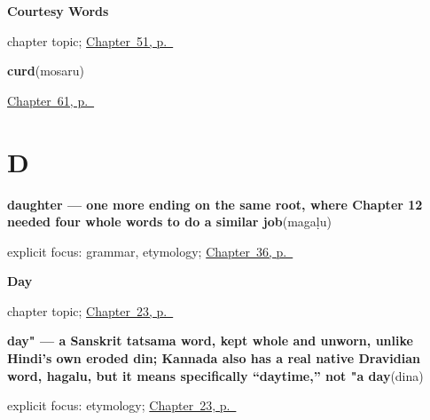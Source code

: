 \noindent\begin{minipage}[t]{\linewidth}
\raggedright
\textbf{Courtesy Words}\par
\footnotesize chapter topic; \hyperref[ch:ka-courtesy]{Chapter~51, p.~\pageref*{ch:ka-courtesy}}
\end{minipage}\par\smallskip

\noindent\begin{minipage}[t]{\linewidth}
\raggedright
\textbf{curd}\enspace\emph{}\enspace(mosaru)\par
\footnotesize \hyperref[ch:ka-kitchen]{Chapter~61, p.~\pageref*{ch:ka-kitchen}}
\end{minipage}\par\smallskip

\section*{D}

\noindent\begin{minipage}[t]{\linewidth}
\raggedright
\textbf{daughter — one more ending on the same root, where Chapter 12 needed four whole words to do a similar job}\enspace\emph{}\enspace(magaḷu)\par
\footnotesize explicit focus: grammar, etymology; \hyperref[ch:ka-child-son-daughter]{Chapter~36, p.~\pageref*{ch:ka-child-son-daughter}}
\end{minipage}\par\smallskip

\noindent\begin{minipage}[t]{\linewidth}
\raggedright
\textbf{Day}\par
\footnotesize chapter topic; \hyperref[ch:ka-day]{Chapter~23, p.~\pageref*{ch:ka-day}}
\end{minipage}\par\smallskip

\noindent\begin{minipage}[t]{\linewidth}
\raggedright
\textbf{day" — a Sanskrit tatsama word, kept whole and unworn, unlike Hindi's own eroded din; Kannada also has a real native Dravidian word, hagalu, but it means specifically \textquotedblleft{}daytime,\textquotedblright{} not "a day}\enspace\emph{}\enspace(dina)\par
\footnotesize explicit focus: etymology; \hyperref[ch:ka-day]{Chapter~23, p.~\pageref*{ch:ka-day}}
\end{minipage}\par\smallskip

